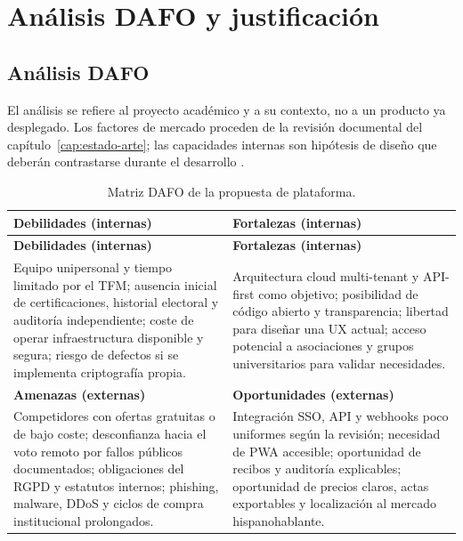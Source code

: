 \chapter{Análisis DAFO y justificación}
\label{cap:dafo}

\section{Análisis DAFO}
\label{sec:dafo}

El análisis se refiere al proyecto académico y a su contexto, no a un producto
ya desplegado. Los factores de mercado proceden de la revisión documental del
capítulo~\ref{cap:estado-arte}; las capacidades internas son hipótesis de
diseño que deberán contrastarse durante el desarrollo \citep{votedirect2026comparativa,specter2020voatz,haines2020swisspost}.

\small
\begin{longtable}{|p{}|p{}|}
\caption{Matriz DAFO de la propuesta de plataforma.}\label{tab:dafo}\\
\hline
\textbf{Debilidades (internas)} & \textbf{Fortalezas (internas)} \\
\hline
\endfirsthead
\hline
\textbf{Debilidades (internas)} & \textbf{Fortalezas (internas)} \\
\hline
\endhead
\hline
\endfoot
\hline
\endlastfoot
Equipo unipersonal y tiempo limitado por el TFM; ausencia inicial de certificaciones, historial electoral y auditoría independiente; coste de operar infraestructura disponible y segura; riesgo de defectos si se implementa criptografía propia. & Arquitectura cloud multi-tenant y API-first como objetivo; posibilidad de código abierto y transparencia; libertad para diseñar una UX actual; acceso potencial a asociaciones y grupos universitarios para validar necesidades. \\
\hline
\textbf{Amenazas (externas)} & \textbf{Oportunidades (externas)} \\
\hline
Competidores con ofertas gratuitas o de bajo coste; desconfianza hacia el voto remoto por fallos públicos documentados; obligaciones del RGPD y estatutos internos; phishing, malware, DDoS y ciclos de compra institucional prolongados. & Integración SSO, API y webhooks poco uniformes según la revisión; necesidad de PWA accesible; oportunidad de recibos y auditoría explicables; oportunidad de precios claros, actas exportables y localización al mercado hispanohablante. \\
\hline
\end{longtable}
\normalsize

